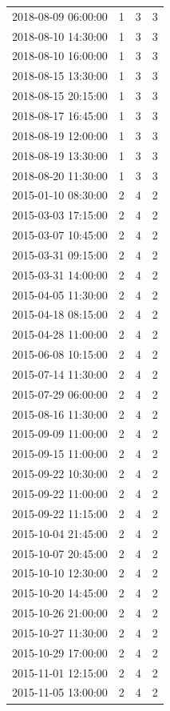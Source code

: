 \begin{tabular}{lrrr}
2018-08-09 06:00:00 & 1 & 3 & 3 \\
2018-08-10 14:30:00 & 1 & 3 & 3 \\
2018-08-10 16:00:00 & 1 & 3 & 3 \\
2018-08-15 13:30:00 & 1 & 3 & 3 \\
2018-08-15 20:15:00 & 1 & 3 & 3 \\
2018-08-17 16:45:00 & 1 & 3 & 3 \\
2018-08-19 12:00:00 & 1 & 3 & 3 \\
2018-08-19 13:30:00 & 1 & 3 & 3 \\
2018-08-20 11:30:00 & 1 & 3 & 3 \\
2015-01-10 08:30:00 & 2 & 4 & 2 \\
2015-03-03 17:15:00 & 2 & 4 & 2 \\
2015-03-07 10:45:00 & 2 & 4 & 2 \\
2015-03-31 09:15:00 & 2 & 4 & 2 \\
2015-03-31 14:00:00 & 2 & 4 & 2 \\
2015-04-05 11:30:00 & 2 & 4 & 2 \\
2015-04-18 08:15:00 & 2 & 4 & 2 \\
2015-04-28 11:00:00 & 2 & 4 & 2 \\
2015-06-08 10:15:00 & 2 & 4 & 2 \\
2015-07-14 11:30:00 & 2 & 4 & 2 \\
2015-07-29 06:00:00 & 2 & 4 & 2 \\
2015-08-16 11:30:00 & 2 & 4 & 2 \\
2015-09-09 11:00:00 & 2 & 4 & 2 \\
2015-09-15 11:00:00 & 2 & 4 & 2 \\
2015-09-22 10:30:00 & 2 & 4 & 2 \\
2015-09-22 11:00:00 & 2 & 4 & 2 \\
2015-09-22 11:15:00 & 2 & 4 & 2 \\
2015-10-04 21:45:00 & 2 & 4 & 2 \\
2015-10-07 20:45:00 & 2 & 4 & 2 \\
2015-10-10 12:30:00 & 2 & 4 & 2 \\
2015-10-20 14:45:00 & 2 & 4 & 2 \\
2015-10-26 21:00:00 & 2 & 4 & 2 \\
2015-10-27 11:30:00 & 2 & 4 & 2 \\
2015-10-29 17:00:00 & 2 & 4 & 2 \\
2015-11-01 12:15:00 & 2 & 4 & 2 \\
2015-11-05 13:00:00 & 2 & 4 & 2 \\

\end{tabular}
